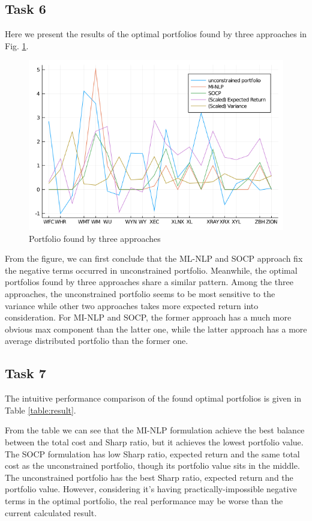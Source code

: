 \documentclass[12pt]{ftec2101}
\begin{document}
\subsection{Task 6}
Here we present the results of the optimal portfolios found by three approaches in Fig. \ref{fig:three}.
\begin{figure}[htbp]
    \centering
    \includegraphics[scale=0.55]{three.png}
    \caption{Portfolio found by three approaches}
    \label{fig:three}
\end{figure}
From the figure, we can first conclude that the ML-NLP and SOCP approach fix the negative terms occurred in unconstrained portfolio. Meanwhile, the optimal portfolios found by three approaches share a similar pattern. Among the three approaches, the unconstrained portfolio seems to be most sensitive to the variance while other two approaches takes more expected return into consideration. For MI-NLP and SOCP, the former approach has a much more obvious max component than the latter one, while the latter approach has a more average distributed portfolio than the former one. 
\subsection{Task 7}
The intuitive performance comparison of the found optimal portfolios is given in Table \ref{table:result}.

From the table we can see that the MI-NLP formulation achieve the best balance between the total cost and Sharp ratio, but it achieves the lowest portfolio value. The SOCP formulation has low Sharp ratio, expected return and the same total cost as the unconstrained portfolio, though its portfolio value sits in the middle. The unconstrained portfolio has the best Sharp ratio, expected return and the portfolio value. However, considering it's having practically-impossible negative terms in the optimal portfolio, the real performance may be worse than the current calculated result.
\end{document}
